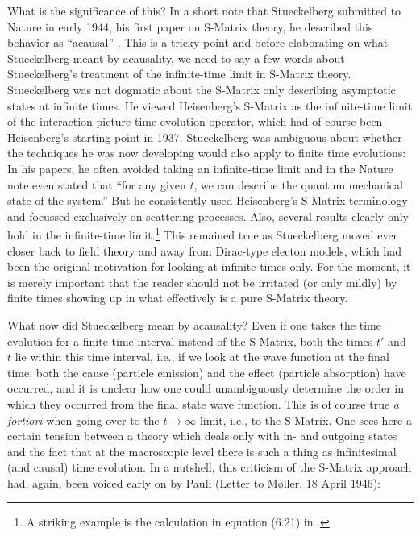\documentclass[12pt]{article}
\begin{document}
What is the significance of this? In a short note that Stueckelberg submitted to Nature in early 1944, his first paper on S-Matrix theory, he described this behavior as ``acausal'' \citep{stueckelberg_1944_an-unambiguous}. This is a tricky point and before elaborating on what Stueckelberg meant by acausality, we need to say a few words about Stueckelberg's treatment of the infinite-time limit in S-Matrix theory. Stueckelberg was not dogmatic about the S-Matrix only describing asymptotic states at infinite times. He viewed Heisenberg's S-Matrix as the infinite-time limit of the interaction-picture time evolution operator, which had of course been Heisenberg's starting point in 1937. Stueckelberg was ambiguous about whether the techniques he was now developing would also apply to finite time evolutions: In his papers, he often avoided taking an infinite-time limit and in the Nature note even stated that ``for any given $t$, we can describe the quantum mechanical state of the system.'' But he consistently used Heisenberg's S-Matrix terminology and focussed exclusively on scattering processes. Also, several results clearly only hold in the infinite-time limit.\footnote{A striking example is the calculation in equation (6.21) in \citep{stueckelberg_1944_un-modele}.} This remained true as Stueckelberg moved ever closer back to field theory and away from Dirac-type electon models, which had been the original motivation for looking at infinite times only. For the moment, it is merely important that the reader should not be irritated (or only mildly) by finite times showing up in what effectively is a pure S-Matrix theory.

What now did Stueckelberg mean by acausality? Even if one takes the time evolution for a finite time interval instead of the S-Matrix, both the times $t'$ and $t$ lie within this time interval, i.e., if we look at the wave function at the final time, both the cause (particle emission) and the effect (particle absorption) have occurred, and it is unclear how one could unambiguously determine the order in which they occurred from the final state wave function. This is of course true \emph{a fortiori} when going over to the $t \rightarrow \infty$ limit, i.e., to the S-Matrix. One sees here a certain tension between a theory which deals only with in- and outgoing states and the fact that at the macroscopic level there is such a thing as infinitesimal (and causal) time evolution. In a nutshell, this criticism of the S-Matrix approach had, again, been voiced early on by Pauli (Letter to M\o ller, 18 April 1946):
\end{document}
